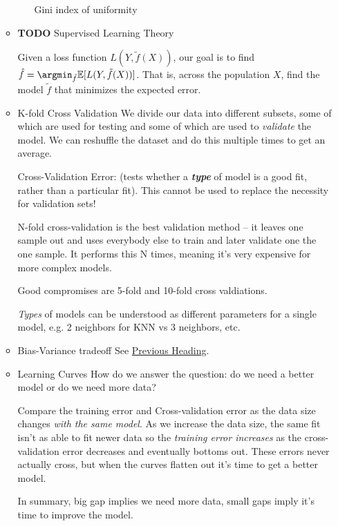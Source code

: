 \documentclass[11pt]{article}
\begin{document}
\begin{itemize}
\begin{itemize}
\begin{itemize}
Gini index of uniformity
\end{itemize}

\item {\bfseries\sffamily TODO} Supervised Learning Theory
\label{sec-3-3-1-4}

Given a loss function $L(Y, \tilde f(X))$, our goal is to find $\hat f = \argmin_{\tilde f} \mathbb{E}[L(Y, \tilde f(X))]$. That is, across the population $X$, find the model $\tilde f$ that minimizes the expected error.

\item K-fold Cross Validation
\label{sec-3-3-1-5}
We divide our data into different subsets, some of which are used for testing and some of which are used to \emph{validate} the model. We can reshuffle the dataset and do this multiple times to get an average.

Cross-Validation Error: (tests whether a \textbf{\emph{type}} of model is a good fit, rather than a particular fit). This cannot be used to replace the necessity for validation sets!

N-fold cross-validation is the best validation method -- it leaves one sample out and uses everybody else to train and later validate one the one sample. It performs this N times, meaning it's very expensive for more complex models.

Good compromises are 5-fold and 10-fold cross valdiations.

\emph{Types} of models can be understood as different parameters for a single model, e.g. 2 neighbors for KNN vs 3 neighbors, etc.

\item Bias-Variance tradeoff
\label{sec-3-3-1-6}
See \hyperref[sec-3-1-1-1]{Previous Heading}.

\item Learning Curves
\label{sec-3-3-1-7}
How do we answer the question: do we need a better model or do we need more data?

Compare the training error and Cross-validation error as the data size changes \emph{with the same model}. As we increase the data size, the same fit isn't as able to fit newer data so the \emph{training error increases} as the cross-validation error decreases and eventually bottoms out. These errors never actually cross, but when the curves flatten out it's time to get a better model.

In summary, big gap implies we need more data, small gaps imply it's time to improve the model.


\end{itemize}
\end{itemize}
\end{document}
